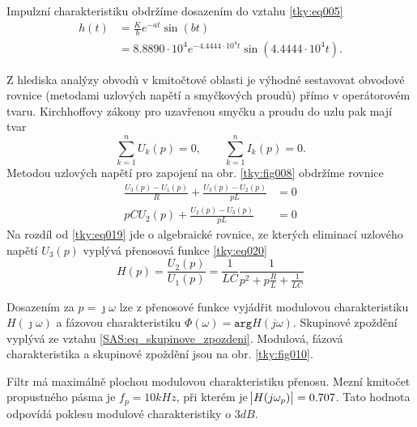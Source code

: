 \begin{mdframed}[style=mdexam]
\begin{example}
    Impulzní charakteristiku obdržíme dosazením do vztahu \ref{tky:eq005}
    \begin{align*}
      h(t)&=\frac{K}{b}e^{-at}\sin(bt)                                      \\
          &=8.8890\cdot10^4e^{-4.4444\cdot10^4t}\sin(4.4444\cdot10^4t).
    \end{align*}
        
      {\centering
      \captionsetup{type=figure}
      \label{tky:fig009}
      \par}
    
    Z hlediska analýzy obvodů v kmitočtové oblasti je výhodné sestavovat obvodové rovnice (metodami
    uzlových napětí a smyčkových proudů) přímo v operátorovém tvaru. Kirchhoffovy zákony pro
    uzavřenou smyčku a proudu do uzlu pak mají tvar $$\sum_{k=1}^{n}U_k(p) = 0, \qquad
    \sum_{k=1}^{n}I_k(p) = 0.$$ Metodou uzlových napětí pro zapojení na obr. \ref{tky:fig008}
    obdržíme rovnice
    \begin{align}
      \frac{U_3(p)-U_1(p)}{R}+\frac{U_3(p)-U_2(p)}{pL} &=  0 \\
      pCU_2(p) + \frac{U_2(p)-U_3(p)}{pL}              &=  0 
    \end{align}
    Na rozdíl od \ref{tky:eq019} jde o algebraické rovnice, ze kterých eliminací uzlového napětí
    $U_3(p)$ vyplývá přenosová funkce \ref{tky:eq020} $$H(p) = \frac{U_2(p)}{U_1(p)} =
    \frac{1}{LC}\frac{1}{p^2+p\frac{R}{L} + \frac{1}{LC}}$$
    
    {\centering
      \captionsetup{type=figure}
      \label{tky:fig010}
      \par}    
    
    Dosazením za $p=\jmath\omega$ lze z přenosové funkce vyjádřit modulovou charakteristiku
    $H(\jmath\omega)$ a fázovou charakteristiku $\Phi(\omega)= \texttt{arg} H(j\omega)$. Skupinové
    zpoždění vyplývá ze vztahu \ref{SAS:eq_skupinove_zpozdeni}. Modulová, fázová charakteristika a
    skupinové zpoždění jsou na obr. \ref{tky:fig010}.
    
    Filtr má maximálně plochou modulovou charakteristiku přenosu. Mezní kmitočet propustného pásma
    je $f_p = 10 kHz$, při kterém je $\abs{H(j\omega_p)}= 0.707$. Tato hodnota odpovídá poklesu
    modulové charakteristiky o $3 dB$.
    
  \end{example} 
  
  
\end{mdframed}